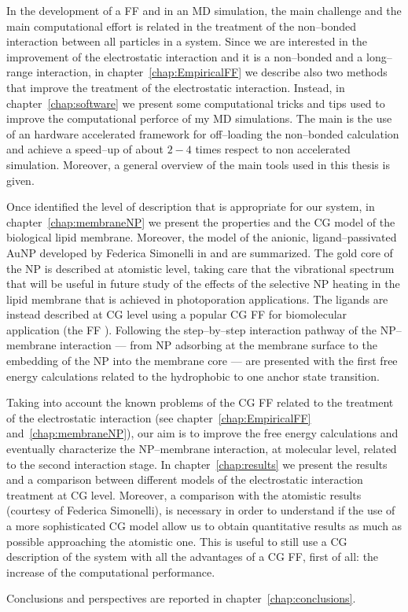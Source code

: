 In the development of a \ac{FF} and in an \ac{MD} simulation, the main challenge and the main computational effort is related in the treatment of the non--bonded interaction between all particles in a system. Since we are interested in the improvement of the electrostatic interaction and it is a non--bonded and a long--range interaction, in chapter~\ref{chap:EmpiricalFF} we describe also two methods that improve the treatment of the electrostatic interaction. Instead, in chapter~\ref{chap:software} we present some computational tricks and tips used to improve the computational perforce of my \ac{MD} simulations. The main is the use of an hardware accelerated framework for off--loading the non--bonded calculation and achieve a speed--up of about $2-4$ times respect to non accelerated simulation. Moreover, a general overview of the main tools used in this thesis is given.

Once identified the level of description that is appropriate for our system, in chapter~\ref{chap:membraneNP} we present the properties and the \ac{CG} model of the biological lipid membrane. Moreover, the model of the anionic, ligand--passivated \ac{AuNP} developed by Federica Simonelli \etal in \cite{simonelliThesis} and \cite{ourPaper} are summarized. The gold core of the \ac{NP} is described at atomistic level, taking care that the vibrational spectrum that will be useful in future study of the effects of the selective \ac{NP} heating in the lipid membrane that is achieved in photoporation applications. The ligands are instead described at \ac{CG} level using a popular \ac{CG} \ac{FF} for biomolecular application (the \martini \ac{FF} \cite{Martini}). Following the step--by--step interaction pathway of the \ac{NP}--membrane interaction --- from \ac{NP} adsorbing at the membrane surface to the embedding of the \ac{NP} into the membrane core --- are presented with the first free energy calculations related to the hydrophobic to one anchor state transition.

Taking into account the known problems of the \martini \ac{CG} \ac{FF} related to the treatment of the electrostatic interaction (see chapter~\ref{chap:EmpiricalFF} and~\ref{chap:membraneNP}), our aim is to improve the free energy calculations and eventually characterize the \ac{NP}--membrane interaction, at molecular level, related to the second interaction stage. In chapter~\ref{chap:results} we present the results and a comparison between different models of the electrostatic interaction treatment at \ac{CG} level. Moreover, a comparison with the atomistic results (courtesy of Federica Simonelli), is necessary in order to understand if the use of a more sophisticated \ac{CG} model allow us to obtain quantitative results as much as possible approaching the atomistic one. This is useful to still use a \ac{CG} description of the system with all the advantages of a \ac{CG} \ac{FF}, first of all: the increase of the computational performance.

Conclusions and perspectives are reported in chapter~\ref{chap:conclusions}.


\endgroup